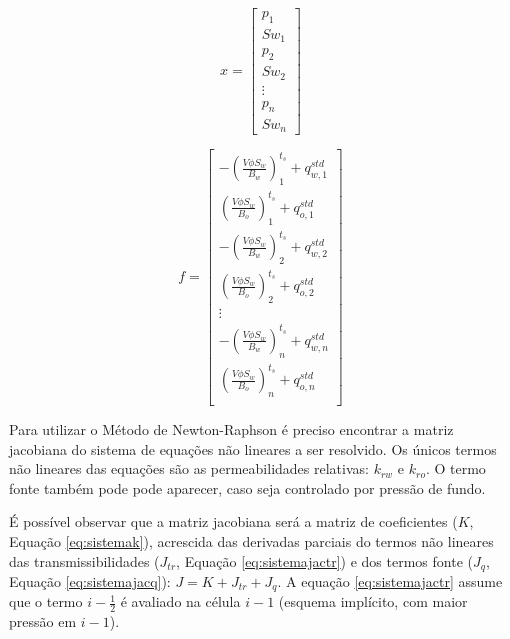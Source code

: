 \documentclass[final,5p]{elsarticle}
\numberwithin{equation}{section}
\begin{document}
        \begin{equation}
            x =
            \begin{bmatrix}
                p_{1}  \\
                Sw_{1}  \\
                p_{2}  \\
                Sw_{2}  \\
                \vdots \\
                p_{n} \\
                Sw_{n}
            \end{bmatrix}
            \label{eq:sistemax}
        \end{equation}

        \begin{equation}
            f =
            \begin{bmatrix}
                - \left(\frac{V \phi S_w}{B_w}\right)_1^{t_s} + q^{std}_{w,1}  \\
                  \left(\frac{V \phi S_w}{B_o}\right)_1^{t_s} + q^{std}_{o,1}  \\
                - \left(\frac{V \phi S_w}{B_w}\right)_2^{t_s} + q^{std}_{w,2}  \\
                  \left(\frac{V \phi S_w}{B_o}\right)_2^{t_s} + q^{std}_{o,2}  \\
                \vdots \\
                - \left(\frac{V \phi S_w}{B_w}\right)_n^{t_s} + q^{std}_{w,n}  \\
                  \left(\frac{V \phi S_w}{B_o}\right)_n^{t_s} + q^{std}_{o,n}  \\
            \end{bmatrix}
            \label{eq:sistemaf}
        \end{equation}

        Para utilizar o Método de Newton-Raphson é preciso encontrar a matriz jacobiana do sistema de equações não lineares a ser resolvido. Os únicos termos não lineares das equações são as permeabilidades relativas: $k_{rw}$ e $k_{ro}$. O termo fonte também pode pode aparecer, caso seja controlado por pressão de fundo.

        É possível observar que a matriz jacobiana será a matriz de coeficientes ($K$, Equação \ref{eq:sistemak}), acrescida das derivadas parciais do termos não lineares das transmissibilidades ($J_{tr}$, Equação \ref{eq:sistemajactr}) e dos termos fonte ($J_{q}$, Equação \ref{eq:sistemajacq}): $J=K+J_{tr}+J_q$. A equação \ref{eq:sistemajactr} assume que o termo $i-\frac{1}{2}$ é avaliado na célula $i-1$ (esquema implícito, com maior pressão em $i-1$).
\end{document}
